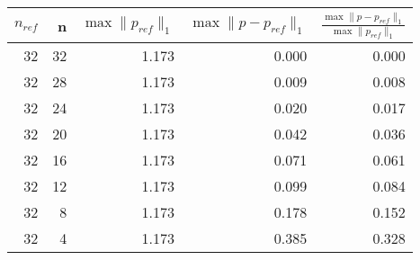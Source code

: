 \begin{tabular}{rrrrr}
\toprule
$n_{ref}$ & n & $\max \| p_{ref} \|_1$ & $\max \| p-p_{ref} \|_1$ & $\frac{\max \| p-p_{ref} \|_1}{\max \| p_{ref} \|_1}$ \\
\midrule
32 & 32 & 1.173 & 0.000 & 0.000 \\
32 & 28 & 1.173 & 0.009 & 0.008 \\
32 & 24 & 1.173 & 0.020 & 0.017 \\
32 & 20 & 1.173 & 0.042 & 0.036 \\
32 & 16 & 1.173 & 0.071 & 0.061 \\
32 & 12 & 1.173 & 0.099 & 0.084 \\
32 & 8 & 1.173 & 0.178 & 0.152 \\
32 & 4 & 1.173 & 0.385 & 0.328 \\
\bottomrule
\end{tabular}

